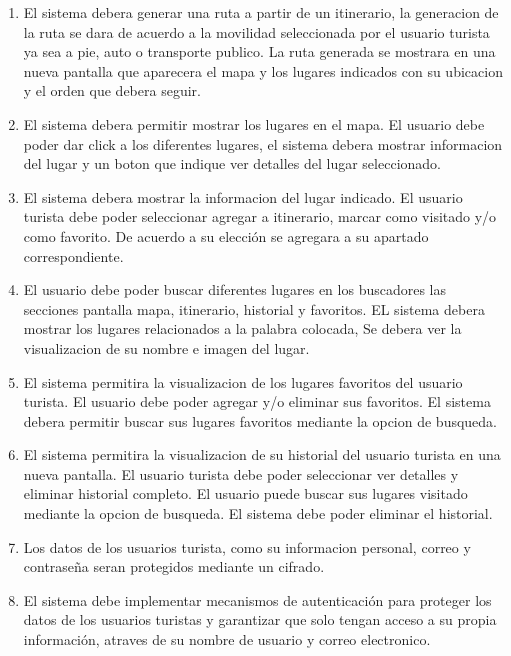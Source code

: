 \documentclass{article}
\begin{document}
\begin{enumerate}
    \item El sistema debera generar una ruta a partir de un itinerario, la generacion de la ruta se dara de acuerdo a la movilidad seleccionada por el usuario turista ya sea a pie, auto o transporte publico. La ruta generada se mostrara en una nueva pantalla que aparecera el mapa y los lugares indicados con su ubicacion y el orden que debera seguir.
    
    \item El sistema debera permitir mostrar los lugares en el mapa. El usuario debe poder dar click a los diferentes lugares, el sistema debera mostrar informacion del lugar y un boton que indique ver detalles del lugar seleccionado.
    
    \item El sistema debera mostrar la informacion del lugar indicado. El usuario turista debe poder seleccionar agregar a itinerario, marcar como visitado y/o como favorito. De acuerdo a su elección se agregara a su apartado correspondiente.
    
    \item El usuario debe poder buscar diferentes lugares en los buscadores las secciones pantalla mapa, itinerario, historial y favoritos. EL sistema debera mostrar los lugares relacionados a la palabra colocada, Se debera ver la visualizacion de su nombre e imagen del lugar.
    
    \item El sistema permitira la visualizacion de los lugares favoritos del usuario turista. El usuario debe poder agregar y/o eliminar sus favoritos. El sistema debera permitir buscar sus lugares favoritos mediante la opcion de busqueda.
    
    \item El sistema permitira la visualizacion de su historial del usuario turista en una nueva pantalla. El usuario turista debe poder seleccionar ver detalles y eliminar historial completo. El usuario puede buscar sus lugares visitado mediante la opcion de busqueda. El sistema debe poder eliminar el historial.
        
    \item Los datos de los usuarios turista, como su informacion personal, correo y contraseña seran protegidos mediante un cifrado.
    
    \item El sistema debe implementar mecanismos de autenticación para proteger los datos de los usuarios turistas y garantizar que solo tengan acceso a su propia información, atraves de su nombre de usuario y correo electronico.


\end{enumerate}
\end{document}
